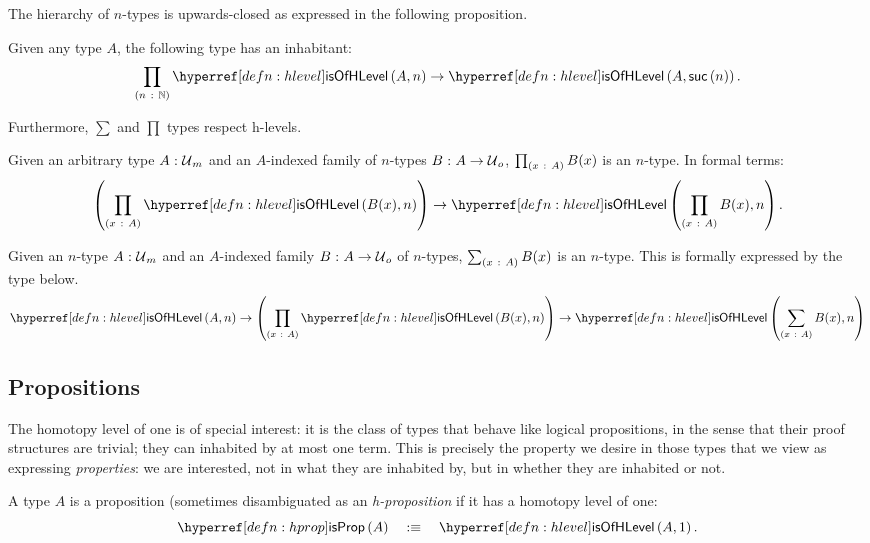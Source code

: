 The hierarchy of $n$-types is upwards-closed as expressed in the following proposition.
\begin{prop}\label{prop:level-up}
  Given any type $A$, the following type has an inhabitant:
  \begin{equation*}
    \pity{n}{\mathbb{N}}{\isofhlevel{A}{n} \rightarrow \isofhlevel{A}{\suc{n}}}.
  \end{equation*}
\end{prop}

Furthermore, $\sum$ and $\prod$ types respect h-levels.
\begin{prop}\label{prop:is-of-level-pi}
  Given an arbitrary type $A\hspace{0.1mm}:\hspace{0.1mm}\mathcal{U}{}_m$ and an $A$-indexed family of $n$-types
  $B\hspace{0.1mm}:\hspace{0.1mm}A \rightarrow \mathcal{U}{}_o$, $\prod_{(x~:~A)} B(x)$ is an $n$-type. In formal
  terms:
  \begin{equation*}
    \left( \pity{x}{A}{\isofhlevel{B(x)}{n}} \right)
      \rightarrow \isofhlevel{\pity{x}{A}{B(x)}}{n}.
  \end{equation*}
\end{prop}

\begin{prop}\label{prop:is-of-level-sigma}
  Given an $n$-type $A\hspace{0.1mm}:\hspace{0.1mm}\mathcal{U}{}_m$ and an $A$-indexed family
  $B\hspace{0.1mm}:\hspace{0.1mm}A \rightarrow \mathcal{U}{}_o$ of $n$-types, $\sum_{(x~:~A)} B(x)$ is an $n$-type.
  This is formally expressed by the type below.
  \begin{equation*}
      \isofhlevel{A}{n}
    \rightarrow \left( \pity{x}{A}{\isofhlevel{B(x)}{n}} \right)
    \rightarrow \isofhlevel{\sigmaty{x}{A}{B(x)}}{n}
  \end{equation*}
\end{prop}

\subsection{Propositions}\label{subsec:prop}

The homotopy level of one is of special interest: it is the class of types that behave
like logical propositions, in the sense that their proof structures are trivial; they can
inhabited by at most one term. This is precisely the property we desire in those types
that we view as expressing \emph{properties}: we are interested, not in what they are
inhabited by, but in whether they are inhabited or not.

\begin{defn}[Proposition]\label{defn:prop'}
  A type $A$ is a proposition (sometimes disambiguated as an \emph{h-proposition} if it
  has a homotopy level of one:
  \begin{equation*}
    \isprop{A} \quad\is\quad \isofhlevel{A}{1}.
  \end{equation*}
\end{defn}

